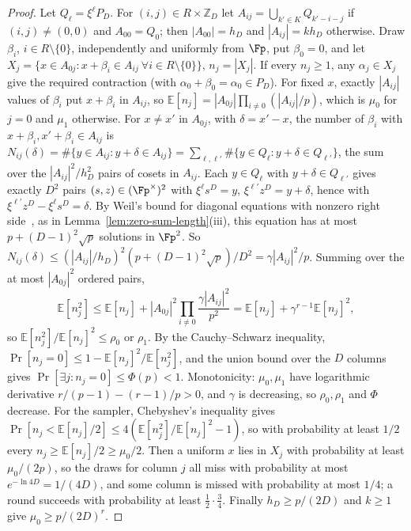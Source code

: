 \begin{proof}
Let $Q_\ell = \xi^\ell P_D$. For $(i,j) \in R\times\mathbb{Z}_D$ let $A_{ij} = \bigcup_{k'\in K}Q_{k'-i-j}$ if $(i,j) \ne (0,0)$ and $A_{00} = Q_0$; then $|A_{00}| = h_D$ and $|A_{ij}| = kh_D$ otherwise. Draw $\beta_i$, $i \in R\setminus\{0\}$, independently and uniformly from $\Fp$, put $\beta_0 = 0$, and let $X_j = \{x \in A_{0j} : x + \beta_i \in A_{ij}\ \forall i \in R\setminus\{0\}\}$, $n_j = |X_j|$. If every $n_j \ge 1$, any $\alpha_j \in X_j$ give the required contraction (with $\alpha_0 + \beta_0 = \alpha_0 \in P_D$). For fixed $x$, exactly $|A_{ij}|$ values of $\beta_i$ put $x + \beta_i$ in $A_{ij}$, so $\mathbb{E}[n_j] = |A_{0j}|\prod_{i\ne0}(|A_{ij}|/p)$, which is $\mu_0$ for $j = 0$ and $\mu_1$ otherwise. For $x \ne x'$ in $A_{0j}$, with $\delta = x'-x$, the number of $\beta_i$ with $x + \beta_i, x' + \beta_i \in A_{ij}$ is $N_{ij}(\delta) = \#\{y \in A_{ij} : y + \delta \in A_{ij}\} = \sum_{\ell,\ell'}\#\{y \in Q_\ell : y + \delta \in Q_{\ell'}\}$, the sum over the $|A_{ij}|^2/h_D^2$ pairs of cosets in $A_{ij}$. Each $y \in Q_\ell$ with $y + \delta \in Q_{\ell'}$ gives exactly $D^2$ pairs $(s,z) \in (\Fp^\times)^2$ with $\xi^{\ell}s^D = y$, $\xi^{\ell'}z^D = y + \delta$, hence with $\xi^{\ell'}z^D - \xi^\ell s^D = \delta$. By Weil's bound for diagonal equations with nonzero right side~\cite[Chapter~6]{LidlNiederreiter1997}, as in Lemma~\ref{lem:zero-sum-length}(iii), this equation has at most $p + (D-1)^2\sqrt p$ solutions in $\Fp^2$. So $N_{ij}(\delta) \le (|A_{ij}|/h_D)^2(p + (D-1)^2\sqrt p)/D^2 = \gamma|A_{ij}|^2/p$. Summing over the at most $|A_{0j}|^2$ ordered pairs,
\[
  \mathbb{E}[n_j^2] \le \mathbb{E}[n_j] + |A_{0j}|^2\prod_{i\ne0}\frac{\gamma|A_{ij}|^2}{p^2} = \mathbb{E}[n_j] + \gamma^{r-1}\mathbb{E}[n_j]^2 ,
\]
so $\mathbb{E}[n_j^2]/\mathbb{E}[n_j]^2 \le \rho_0$ or $\rho_1$. By the Cauchy--Schwarz inequality, $\Pr[n_j = 0] \le 1 - \mathbb{E}[n_j]^2/\mathbb{E}[n_j^2]$, and the union bound over the $D$ columns gives $\Pr[\exists j: n_j = 0] \le \Phi(p) < 1$. Monotonicity: $\mu_0,\mu_1$ have logarithmic derivative $r/(p-1) - (r-1)/p > 0$, and $\gamma$ is decreasing, so $\rho_0,\rho_1$ and $\Phi$ decrease. For the sampler, Chebyshev's inequality gives $\Pr[n_j < \mathbb{E}[n_j]/2] \le 4(\mathbb{E}[n_j^2]/\mathbb{E}[n_j]^2 - 1)$, so with probability at least $1/2$ every $n_j \ge \mathbb{E}[n_j]/2 \ge \mu_0/2$. Then a uniform $x$ lies in $X_j$ with probability at least $\mu_0/(2p)$, so the draws for column $j$ all miss with probability at most $e^{-\ln 4D} = 1/(4D)$, and some column is missed with probability at most $1/4$; a round succeeds with probability at least $\frac12\cdot\frac34$. Finally $h_D \ge p/(2D)$ and $k \ge 1$ give $\mu_0 \ge p/(2D)^r$.
\end{proof}

